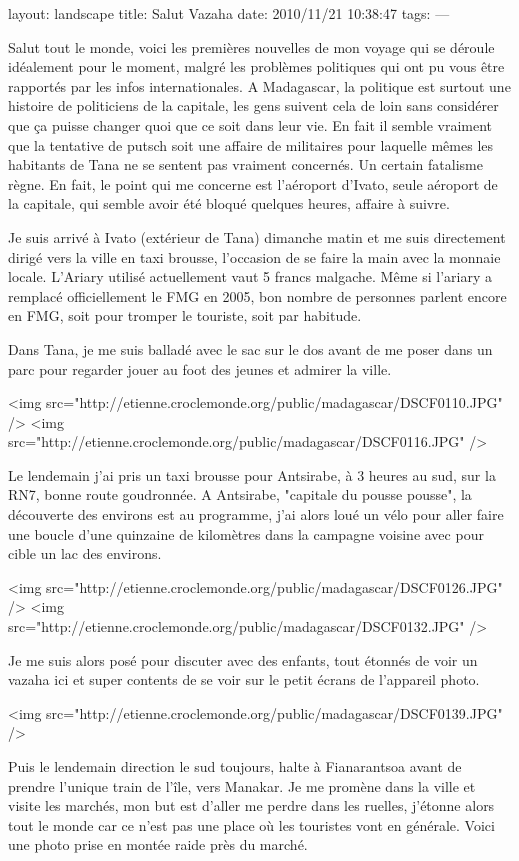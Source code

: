layout: landscape
title: Salut Vazaha
date: 2010/11/21 10:38:47
tags:
---

Salut tout le monde, voici les premières nouvelles de mon voyage qui se déroule idéalement pour le moment, malgré les problèmes politiques qui ont pu vous être rapportés par les infos internationales. A Madagascar, la politique est surtout une histoire de politiciens de la capitale, les gens suivent cela de loin sans considérer que ça puisse changer quoi que ce soit dans leur vie. En fait il semble vraiment que la tentative de putsch soit une affaire de militaires pour laquelle mêmes les habitants de Tana ne se sentent pas vraiment concernés. Un certain fatalisme règne. En fait, le point qui me concerne est l'aéroport d'Ivato, seule aéroport de la capitale, qui semble avoir été bloqué quelques heures, affaire à suivre.

Je suis arrivé à Ivato (extérieur de Tana) dimanche matin et me suis directement dirigé vers la ville en taxi brousse, l'occasion de se faire la main avec la monnaie locale. L'Ariary utilisé actuellement vaut 5 francs malgache. Même si l'ariary a remplacé officiellement le FMG en 2005, bon nombre de personnes parlent encore en FMG, soit pour tromper le touriste, soit par habitude.

Dans Tana, je me suis balladé avec le sac sur le dos avant de me poser dans un parc pour regarder jouer au foot des jeunes et admirer la ville.

<img src="http://etienne.croclemonde.org/public/madagascar/DSCF0110.JPG" />
<img src="http://etienne.croclemonde.org/public/madagascar/DSCF0116.JPG" />

Le lendemain j'ai pris un taxi brousse pour Antsirabe, à 3 heures au sud, sur la RN7, bonne route goudronnée. A Antsirabe, "capitale du pousse pousse", la découverte des environs est au programme, j'ai alors loué un vélo pour aller faire une boucle d'une quinzaine de kilomètres dans la campagne voisine avec pour cible un lac des environs.

<img src="http://etienne.croclemonde.org/public/madagascar/DSCF0126.JPG" />
<img src="http://etienne.croclemonde.org/public/madagascar/DSCF0132.JPG" />

Je me suis alors posé pour discuter avec des enfants, tout étonnés de voir un vazaha ici et super contents de se voir sur le petit écrans de l'appareil photo.

<img src="http://etienne.croclemonde.org/public/madagascar/DSCF0139.JPG" />

Puis le lendemain direction le sud toujours, halte à Fianarantsoa avant de prendre l'unique train de l'île, vers Manakar. Je me promène dans la ville et visite les marchés, mon but est d'aller me perdre dans les ruelles, j'étonne alors tout le monde car ce n'est pas une place où les touristes vont en générale. Voici une photo prise en montée raide près du marché.

